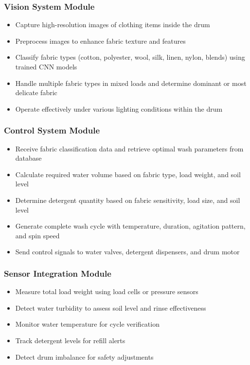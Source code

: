 \subsubsection{Vision System Module}
\begin{itemize}
    \item Capture high-resolution images of clothing items inside the drum
    \item Preprocess images to enhance fabric texture and features
    \item Classify fabric types (cotton, polyester, wool, silk, linen, nylon, blends) using trained CNN models
    \item Handle multiple fabric types in mixed loads and determine dominant or most delicate fabric
    \item Operate effectively under various lighting conditions within the drum
\end{itemize}

\subsubsection{Control System Module}
\begin{itemize}
    \item Receive fabric classification data and retrieve optimal wash parameters from database
    \item Calculate required water volume based on fabric type, load weight, and soil level
    \item Determine detergent quantity based on fabric sensitivity, load size, and soil level
    \item Generate complete wash cycle with temperature, duration, agitation pattern, and spin speed
    \item Send control signals to water valves, detergent dispensers, and drum motor
\end{itemize}

\subsubsection{Sensor Integration Module}
\begin{itemize}
    \item Measure total load weight using load cells or pressure sensors
    \item Detect water turbidity to assess soil level and rinse effectiveness
    \item Monitor water temperature for cycle verification
    \item Track detergent levels for refill alerts
    \item Detect drum imbalance for safety adjustments
\end{itemize}

